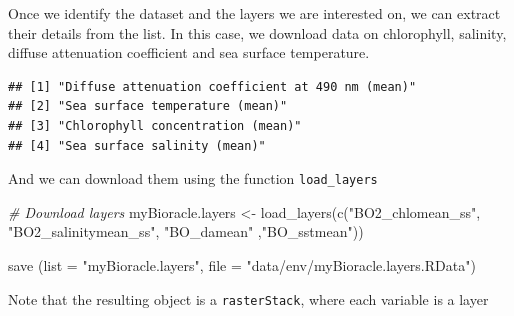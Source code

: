 \documentclass[
]{book}
\newenvironment{Shaded}{\begin{snugshade}}{\end{snugshade}}
\newcommand{\AttributeTok}[1]{\textcolor[rgb]{0.77,0.63,0.00}{#1}}
\newcommand{\CommentTok}[1]{\textcolor[rgb]{0.56,0.35,0.01}{\textit{#1}}}
\newcommand{\FunctionTok}[1]{\textcolor[rgb]{0.00,0.00,0.00}{#1}}
\newcommand{\NormalTok}[1]{#1}
\newcommand{\OtherTok}[1]{\textcolor[rgb]{0.56,0.35,0.01}{#1}}
\newcommand{\SpecialCharTok}[1]{\textcolor[rgb]{0.00,0.00,0.00}{#1}}
\newcommand{\StringTok}[1]{\textcolor[rgb]{0.31,0.60,0.02}{#1}}
\begin{document}
Once we identify the dataset and the layers we are interested on, we can extract their details from the list. In this case, we download data on chlorophyll, salinity, diffuse attenuation coefficient and sea surface temperature.

\begin{Shaded}
\end{Shaded}

\begin{verbatim}
## [1] "Diffuse attenuation coefficient at 490 nm (mean)"
## [2] "Sea surface temperature (mean)"                  
## [3] "Chlorophyll concentration (mean)"                
## [4] "Sea surface salinity (mean)"
\end{verbatim}

And we can download them using the function \texttt{load\_layers}

\begin{Shaded}
\begin{Highlighting}[]
\CommentTok{\# Download layers}
\NormalTok{myBioracle.layers }\OtherTok{\textless{}{-}} \FunctionTok{load\_layers}\NormalTok{(}\FunctionTok{c}\NormalTok{(}\StringTok{"BO2\_chlomean\_ss"}\NormalTok{, }\StringTok{"BO2\_salinitymean\_ss"}\NormalTok{, }\StringTok{"BO\_damean"}\NormalTok{ ,}\StringTok{"BO\_sstmean"}\NormalTok{)) }

\FunctionTok{save}\NormalTok{ (}\AttributeTok{list =} \StringTok{"myBioracle.layers"}\NormalTok{, }\AttributeTok{file =} \StringTok{"data/env/myBioracle.layers.RData"}\NormalTok{)}
\end{Highlighting}
\end{Shaded}

Note that the resulting object is a \texttt{rasterStack}, where each variable is a layer
\end{document}

